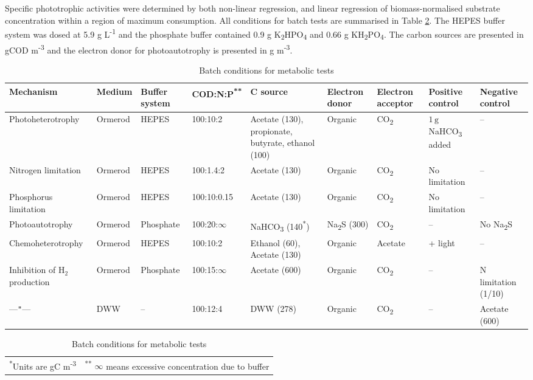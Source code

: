 \skippingparagraph
Specific phototrophic activities were determined by both non-linear regression, and linear regression of biomass-normalised substrate concentration within a region of maximum consumption. All conditions for batch tests are summarised in Table \ref{tab:batch}. The HEPES buffer system was dosed at 5.9 g L\textsuperscript{-1} and the phosphate buffer contained 0.9 g K\textsubscript{2}HPO\textsubscript{4} and 0.66 g KH\textsubscript{2}PO\textsubscript{4}. The carbon sources are presented in gCOD m\textsuperscript{-3} and the electron donor for photoautotrophy is presented in g m\textsuperscript{-3}. 

\begin{table}[tp]
    \centering
    \small
    \renewcommand{\arraystretch}{1.4}
    \caption{Batch conditions for metabolic tests}
    \tabcolsep=0.11cm
    \begin{tabular}{@{}p{3cm} p{1.4cm} p{1.5cm} p{1.7cm} p{1.4cm} p{1.4cm} p{1.4cm} p{1.4cm} p{1.4cm}@{}} \toprule
        Mechanism & Medium & Buffer system & COD:N:P\textsuperscript{**} & C source & Electron donor & Electron acceptor & Positive control & Negative control\\
        \hline
        Photoheterotrophy & Ormerod& HEPES & 100:10:2 & Acetate (130), propionate, butyrate, ethanol (100) & Organic & CO\textsubscript{2}&  $\mathrm{1\, g}$ NaHCO\textsubscript{3} added&  -- \\
        
        Nitrogen limitation & Ormerod&  HEPES & 100:1.4:2& Acetate (130) & Organic & CO\textsubscript{2}& No limitation & -- \\
        
        Phosphorus limitation & Ormerod & HEPES & 100:10:0.15 & Acetate (130) & Organic & CO\textsubscript{2}& No limitation & -- \\
        
        Photoautotrophy & Ormerod & Phosphate & 100:20:$\infty$ & NaHCO\textsubscript{3} (140\textsuperscript{*}) & Na\textsubscript{2}S (300)& CO\textsubscript{2}& -- & No Na\textsubscript{2}S \\
        
        Chemoheterotrophy & Ormerod & HEPES &100:10:2 & Ethanol (60), Acetate (130) & Organic& Acetate& + light& -- \\
        
        Inhibition of $\mathrm{H_2}$ production & 
        Ormerod & Phosphate & 100:15:$\infty$&Acetate (600) & Organic & CO\textsubscript{2} & --  & N limitation (1/10) \\
        ---\texttt{"}---& DWW & -- & 100:12:4 &DWW (278) & Organic & CO\textsubscript{2}&-- &Acetate (600) \\
        \bottomrule
    \end{tabular}
    \footnotesize
    \begin{tabular}{@{}p{4cm} p{10cm}}
        \textsuperscript{*}Units are gC m\textsuperscript{-3} & \textsuperscript{**} $\infty$ means excessive concentration due to buffer \\
    \end{tabular}
    \label{tab:batch}
\end{table}

